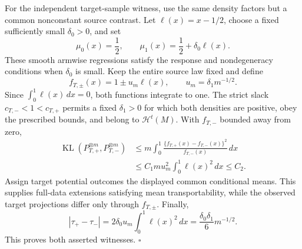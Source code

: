 For the independent target-sample witness, use the same density factors but a common nonconstant source contrast.  Let \(\ell(x)=x-1/2\), choose a fixed sufficiently small \(\delta_0>0\), and set
\[
 \mu_0(x)=\frac12,
 \qquad
 \mu_1(x)=\frac12+\delta_0\ell(x).
\]
These smooth armwise regressions satisfy the response and nondegeneracy conditions when \(\delta_0\) is small.  Keep the entire source law fixed and define
\[
 f_{T,\pm}(x)=1\pm u_m\ell(x),
 \qquad
 u_m=\delta_1m^{-1/2}.
\]
Since \(\int_0^1\ell(x)\,dx=0\), both functions integrate to one.  The strict slack \(c_{T,-}<1<c_{T,+}\) permits a fixed \(\delta_1>0\) for which both densities are positive, obey the prescribed bounds, and belong to \(\mathcal H^t(M)\).  With \(f_{T,-}\) bounded away from zero,
\[
\begin{aligned}
 \operatorname{KL}(P_{T,+}^{\otimes m},P_{T,-}^{\otimes m})
 &\le m\int_0^1\frac{\{f_{T,+}(x)-f_{T,-}(x)\}^2}{f_{T,-}(x)}\,dx\\
 &\le C_1mu_m^2\int_0^1\ell(x)^2\,dx
 \le C_2.
\end{aligned}
\]
Assign target potential outcomes the displayed common conditional means.  This supplies full-data extensions satisfying mean transportability, while the observed target projections differ only through \(f_{T,\pm}\).  Finally,
\[
 |\tau_+-\tau_-|
 =2\delta_0u_m\int_0^1\ell(x)^2\,dx
 =\frac{\delta_0\delta_1}{6}m^{-1/2}.
\]
This proves both asserted witnesses. \(\square\)